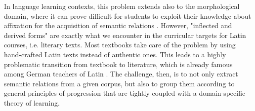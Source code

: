 In language learning contexts, this problem extends also to the morphological domain, where it can prove difficult for students to exploit their knowledge about affixation for the acquisition of semantic relations \parencite[248]{gardnerValidatingConstructWord2007}. However, "inflected and derived forms" are exactly what we encounter in the curricular targets for Latin courses, i.e. literary texts. Most textbooks take care of the problem by using hand-crafted Latin texts instead of authentic ones. This leads to a highly problematic transition from textbook to literature, which is already famous among German teachers of Latin \parencite[115]{schibelZurAneignungLateinischer2013}. The challenge, then, is to not only extract semantic relations from a given corpus, but also to group them according to general principles of progression that are tightly coupled with a domain-specific theory of learning.